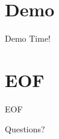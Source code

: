 \documentclass{beamer}
\begin{document}
\section{Demo}
\begin{frame}
\Huge{\centerline{Demo Time!}}
\end{frame}


\section{EOF}
\begin{frame}
\Huge{\centerline{EOF}\centerline{Questions?}}
\end{frame}

\end{document}
